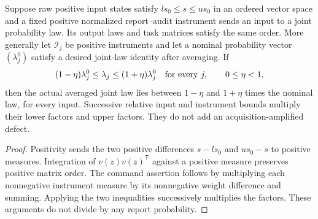 \begin{proposition}\label{prop:positive-order}
Suppose raw positive input states satisfy $ls_0\le s\le us_0$ in an ordered vector space and a fixed positive normalized report--audit instrument sends an input to a joint probability law. Its output laws and task matrices satisfy the same order. More generally let $\mathcal I_j$ be positive instruments and let a nominal probability vector $(\lambda_j^0)$ satisfy a desired joint-law identity after averaging. If
\[
 (1-\eta)\lambda_j^0\le\lambda_j\le(1+\eta)\lambda_j^0
 \quad\hbox{for every }j,\qquad 0\le\eta<1,
\]
then the actual averaged joint law lies between $1-\eta$ and $1+\eta$ times the nominal law, for every input. Successive relative input and instrument bounds multiply their lower factors and upper factors. They do not add an acquisition-amplified defect.
\end{proposition}
\begin{proof}
Positivity sends the two positive differences $s-ls_0$ and $us_0-s$ to positive measures. Integration of $v(z)v(z)^\mathsf T$ against a positive measure preserves positive matrix order. The command assertion follows by multiplying each nonnegative instrument measure by its nonnegative weight difference and summing. Applying the two inequalities successively multiplies the factors. These arguments do not divide by any report probability.
\end{proof}

